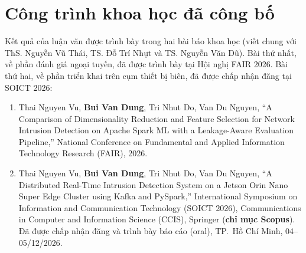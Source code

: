 \section{Công trình khoa học đã công bố}
Kết quả của luận văn được trình bày trong hai bài báo khoa học (viết chung với ThS. Nguyễn Vũ Thái, TS. Đỗ Trí Nhựt và TS. Nguyễn Văn Dũ). Bài thứ nhất, về phần đánh giá ngoại tuyến, đã được trình bày tại Hội nghị FAIR 2026. Bài thứ hai, về phần triển khai trên cụm thiết bị biên, đã được chấp nhận đăng tại SOICT 2026:
\begin{enumerate}
  \item Thai Nguyen Vu, \textbf{Bui Van Dung}, Tri Nhut Do, Van Du Nguyen, ``A Comparison of Dimensionality Reduction and Feature Selection for Network Intrusion Detection on Apache Spark ML with a Leakage-Aware Evaluation Pipeline,'' National Conference on Fundamental and Applied Information Technology Research (FAIR), 2026.
  \item Thai Nguyen Vu, \textbf{Bui Van Dung}, Tri Nhut Do, Van Du Nguyen, ``A Distributed Real-Time Intrusion Detection System on a Jetson Orin Nano Super Edge Cluster using Kafka and PySpark,'' International Symposium on Information and Communication Technology (SOICT 2026), Communications in Computer and Information Science (CCIS), Springer (\textbf{chỉ mục Scopus}). Đã được chấp nhận đăng và trình bày báo cáo (oral), TP.~Hồ Chí Minh, 04--05/12/2026.
\end{enumerate}

